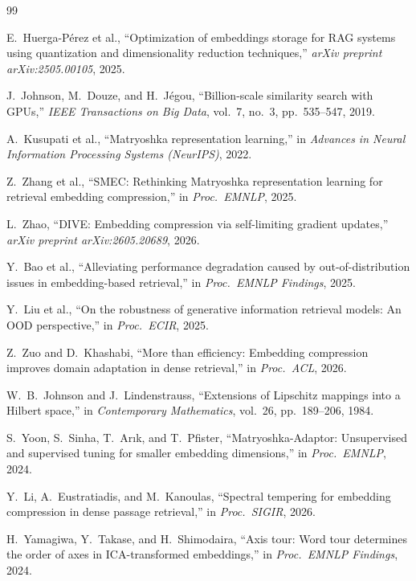 \documentclass[sigconf]{acmart}
\begin{document}
\begin{thebibliography}{99}

E.~Huerga-P\'erez et al., ``Optimization of embeddings storage for RAG systems using quantization and dimensionality reduction techniques,'' \emph{arXiv preprint arXiv:2505.00105}, 2025.

J.~Johnson, M.~Douze, and H.~J\'egou, ``Billion-scale similarity search with GPUs,'' \emph{IEEE Transactions on Big Data}, vol.~7, no.~3, pp.~535--547, 2019.

A.~Kusupati et al., ``Matryoshka representation learning,'' in \emph{Advances in Neural Information Processing Systems (NeurIPS)}, 2022.

Z.~Zhang et al., ``SMEC: Rethinking Matryoshka representation learning for retrieval embedding compression,'' in \emph{Proc.\ EMNLP}, 2025.

L.~Zhao, ``DIVE: Embedding compression via self-limiting gradient updates,'' \emph{arXiv preprint arXiv:2605.20689}, 2026.

Y.~Bao et al., ``Alleviating performance degradation caused by out-of-distribution issues in embedding-based retrieval,'' in \emph{Proc.\ EMNLP Findings}, 2025.

Y.~Liu et al., ``On the robustness of generative information retrieval models: An OOD perspective,'' in \emph{Proc.\ ECIR}, 2025.

Z.~Zuo and D.~Khashabi, ``More than efficiency: Embedding compression improves domain adaptation in dense retrieval,'' in \emph{Proc.\ ACL}, 2026.

W.~B.~Johnson and J.~Lindenstrauss, ``Extensions of Lipschitz mappings into a Hilbert space,'' in \emph{Contemporary Mathematics}, vol.~26, pp.~189--206, 1984.

S.~Yoon, S.~Sinha, T.~Ar{\i}k, and T.~Pfister, ``Matryoshka-Adaptor: Unsupervised and supervised tuning for smaller embedding dimensions,'' in \emph{Proc.\ EMNLP}, 2024.

Y.~Li, A.~Eustratiadis, and M.~Kanoulas, ``Spectral tempering for embedding compression in dense passage retrieval,'' in \emph{Proc.\ SIGIR}, 2026.

H.~Yamagiwa, Y.~Takase, and H.~Shimodaira, ``Axis tour: Word tour determines the order of axes in ICA-transformed embeddings,'' in \emph{Proc.\ EMNLP Findings}, 2024.


\end{thebibliography}
\end{document}
